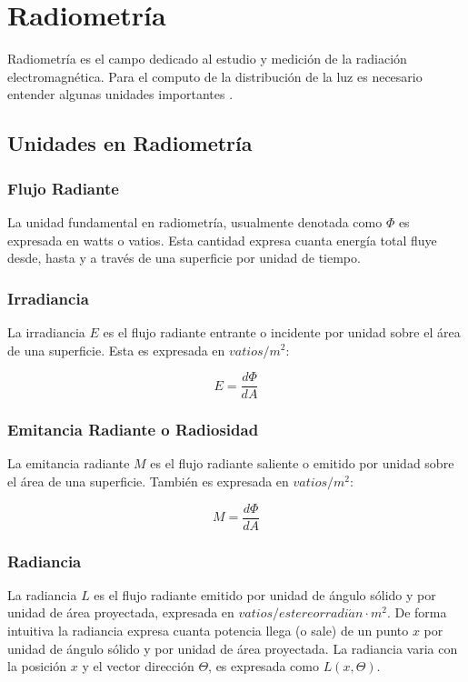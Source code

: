 \section{Radiometría}
Radiometría es el campo dedicado al estudio y medición de la radiación electromagnética. Para el computo de la distribución de la luz es necesario entender algunas unidades importantes \cite{advanced_gi2006}.

\subsection{Unidades en Radiometría}

\subsubsection{Flujo Radiante}
La unidad fundamental en radiometría, usualmente denotada como $\Phi$ es expresada en watts o vatios. Esta cantidad expresa cuanta energía total fluye desde, hasta y a través de una superficie por unidad de tiempo.
\subsubsection{Irradiancia}
\label{subsubsec:irradiance}
La irradiancia $E$ es el flujo radiante entrante o incidente por unidad sobre el área de una superficie. Esta es expresada en $vatios/m^2$:

\begin{equation}
    E = \frac{d\Phi}{dA}
	\label{eq:irradiance_eq}
\end{equation}

\subsubsection{Emitancia Radiante o Radiosidad}
La emitancia radiante $M$ es el flujo radiante saliente o emitido por unidad sobre el área de una superficie. También es expresada en $vatios/m^2$:

\begin{equation}
    M = \frac{d\Phi}{dA}
	\label{eq:radiosity_eq}
\end{equation}

\subsubsection{Radiancia}
La radiancia $L$ es el flujo radiante emitido por unidad de ángulo sólido y por unidad de área proyectada, expresada en $vatios/estereorradi\acute{a}n\cdot m^2$. De forma intuitiva la radiancia expresa cuanta potencia llega (o sale) de un punto $x$ por unidad de ángulo sólido y por unidad de área proyectada. La radiancia varia con la posición $x$ y el vector dirección $\Theta$, es expresada como $L(x,\Theta)$.

